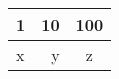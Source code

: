 \protect\hypertarget{id}{}\begin{longtable}[]{@{}lrc@{}}
\hline
1 & 10 & 100\tabularnewline
\hline
\endfirsthead
x & y & z\tabularnewline
\hline
\end{longtable}
